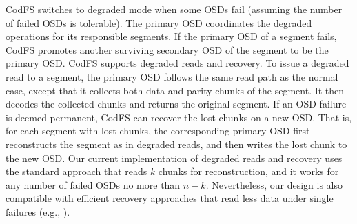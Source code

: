 CodFS switches to degraded mode when some OSDs fail (assuming the number of
failed OSDs is tolerable). 
The primary OSD coordinates the degraded operations for its responsible
segments.  If the primary OSD of a segment fails, CodFS promotes another
surviving secondary OSD of the segment to be the primary OSD.  CodFS supports
degraded reads and recovery.  To issue a degraded read to a segment, the
primary OSD follows the same read path as the normal case, except that it
collects both data and parity chunks of the segment.  It then decodes the
collected chunks and returns the original segment.  If an OSD failure is
deemed permanent, CodFS can recover the lost chunks on a new OSD.  That is,
for each segment with lost chunks, the corresponding primary OSD first
reconstructs the segment as in degraded reads, and then writes the lost chunk
to the new OSD.   Our current implementation of degraded reads and recovery
uses the standard approach that reads $k$ chunks for reconstruction, and it
works for any number of failed OSDs no more than $n-k$.  Nevertheless, our
design is also compatible with efficient recovery approaches that read less
data under single failures (e.g., \cite{xiang10,khan12}). 




